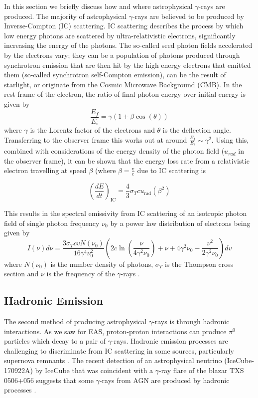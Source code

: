 In this section we briefly discuss how and where astrophysical $\gamma$-rays are produced. The majority of astrophysical $\gamma$-rays are believed to be produced by Inverse-Compton (IC) scattering. IC scattering describes the process by which low energy photons are scattered by ultra-relativistic electrons, significantly increasing the energy of the photons. The so-called seed photon fields accelerated by the electrons vary; they can be a population of photons produced through synchrotron emission that are then hit by the high energy electrons that emitted them (so-called synchrotron self-Compton emission), can be the result of starlight, or originate from the Cosmic Microwave Background (CMB). In the rest frame of the electron, the ratio of final photon energy over initial energy is given by
\begin{equation}
    \frac{E_f}{E_i}=\gamma (1+\beta \cos(\theta))
\end{equation}
where $\gamma$ is the Lorentz factor of the electrons and $\theta$ is the deflection angle. Transferring to the observer frame this works out at around $\frac{E_f}{E_i}\sim \gamma^2$. Using this, combined with considerations of the energy density of the photon field ($u_{rad}$ in the observer frame), it can be shown \cite{longair} that the energy loss rate from a relativistic electron travelling at speed $\beta$ (where $\beta=\frac{\mathrm{v}}{\mathrm{c}}$ due to IC scattering is

\begin{equation}
    \left(\frac{dE}{dt}\right)_{\mathrm{IC}}=\frac{4}{3}\sigma_T c u_{\mathrm{rad}}\left(\beta^2\right)
\end{equation}

This results in the spectral emissivity from IC scattering of an isotropic photon field of single photon frequency $\nu_0$ by a power law distribution of electrons being given by 
\begin{equation}
    I(\nu)d\nu=\frac{3\sigma_TcvN(\nu_0)}{16\gamma^4\nu_0^2}\left(2c\ln\left(\frac{\nu}{4\gamma^2\nu_0}\right)+\nu+4\gamma^2\nu_0-\frac{\nu^2}{2\gamma^2\nu_0}\right)dv
\end{equation}
where $N(\nu_0)$ is the number density of photons, $\sigma_T$ is the Thompson cross section and $\nu$ is the frequency of the $\gamma$-rays \cite{blumenthal}.


\subsection{Hadronic Emission}
The second method of producing astrophysical $\gamma$-rays is through hadronic interactions. As we saw for EAS, proton-proton interactions can produce $\pi^0$ particles which decay to a pair of $\gamma$-rays. Hadronic emission processes are challenging to discriminate from IC scattering in some sources, particularly supernova remnants \cite{rxjcta}. The recent detection of an astrophysical neutrino (IceCube-170922A) by IceCube that was coincident with a $\gamma$-ray flare of the blazar TXS 0506+056 suggests that some $\gamma$-rays from AGN are produced by hadronic processes \cite{TXS}. 

